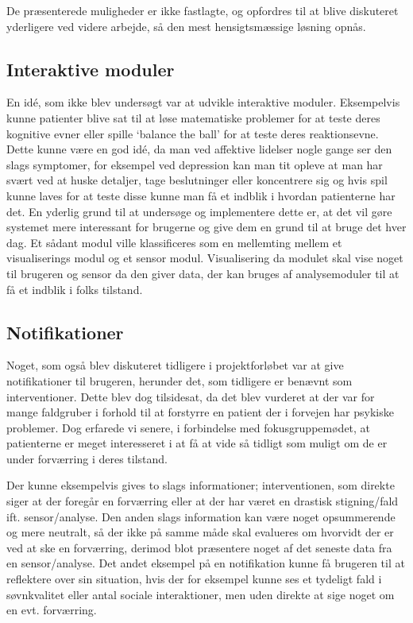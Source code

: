 De præsenterede muligheder er ikke fastlagte, og opfordres til at blive diskuteret yderligere ved videre arbejde, så den mest hensigtsmæssige løsning opnås.

\subsection{Interaktive moduler}
En idé, som ikke blev undersøgt var at udvikle interaktive moduler.
Eksempelvis kunne patienter blive sat til at løse matematiske problemer for at teste deres kognitive evner eller spille `balance the ball' for at teste deres reaktionsevne.
Dette kunne være en god idé, da man ved affektive lidelser nogle gange ser den slags symptomer, for eksempel ved depression kan man tit opleve at man har svært ved at huske detaljer, tage beslutninger eller koncentrere sig og hvis spil kunne laves for at teste disse kunne man få et indblik i hvordan patienterne har det. 
En yderlig grund til at undersøge og implementere dette er, at det vil gøre systemet mere interessant for brugerne og give dem en grund til at bruge det hver dag. 
Et sådant modul ville klassificeres som en mellemting mellem et visualiserings modul og et sensor modul.
Visualisering da modulet skal vise noget til brugeren og sensor da den giver data, der kan bruges af analysemoduler til at få et indblik i folks tilstand.

\subsection{Notifikationer}
Noget, som også blev diskuteret tidligere i projektforløbet var at give notifikationer til brugeren, herunder det, som tidligere er benævnt som interventioner.
Dette blev dog tilsidesat, da det blev vurderet at der var for mange faldgruber i forhold til at forstyrre en patient der i forvejen har psykiske problemer.
Dog erfarede vi senere, i forbindelse med fokusgruppemødet, at patienterne er meget interesseret i at få at vide så tidligt som muligt om de er under forværring i deres tilstand.

Der kunne eksempelvis gives to slags informationer; interventionen, som direkte siger at der foregår en forværring eller at der har været en drastisk stigning/fald ift. sensor/analyse.
Den anden slags information kan være noget opsummerende og mere neutralt, så der ikke på samme måde skal evalueres om hvorvidt der er ved at ske en forværring, derimod blot præsentere noget af det seneste data fra en sensor/analyse.
Det andet eksempel på en notifikation kunne få brugeren til at reflektere over sin situation, hvis der for eksempel kunne ses et tydeligt fald i søvnkvalitet eller antal sociale interaktioner, men uden direkte at sige noget om en evt. forværring.

